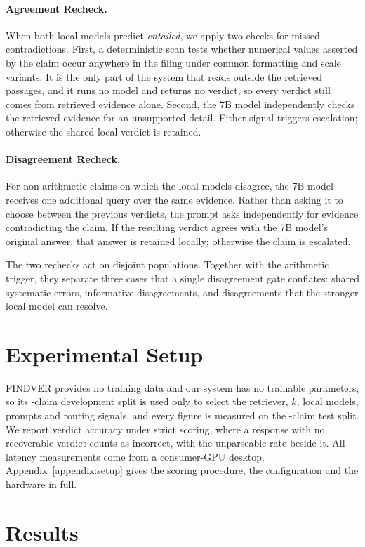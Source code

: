 \documentclass{article}
\begin{document}
\paragraph{Agreement Recheck.}
When both local models predict \emph{entailed}, we apply two checks for missed contradictions. First, a deterministic scan tests whether numerical values asserted by the claim occur anywhere in the filing under common formatting and scale variants. It is the only part of the system that reads outside the retrieved passages, and it runs no model and returns no verdict, so every verdict still comes from retrieved evidence alone. Second, the 7B model independently checks the retrieved evidence for an unsupported detail. Either signal triggers escalation; otherwise the shared local verdict is retained.

\paragraph{Disagreement Recheck.}
For non-arithmetic claims on which the local models disagree, the 7B model receives one additional query over the same evidence. Rather than asking it to choose between the previous verdicts, the prompt asks independently for evidence contradicting the claim. If the resulting verdict agrees with the 7B model's original answer, that answer is retained locally; otherwise the claim is escalated.

The two rechecks act on disjoint populations. Together with the arithmetic trigger, they separate three cases that a single disagreement gate conflates: shared systematic errors, informative disagreements, and disagreements that the stronger local model can resolve.


\section{Experimental Setup}
\label{sec:setup}
FINDVER provides no training data and our system has no trainable parameters, so its \nDev{}-claim development split is used only to select the retriever, $k$, local models, prompts and routing signals, and every figure is measured on the \nTest{}-claim test split. We report verdict accuracy under strict scoring, where a response with no recoverable verdict counts as incorrect, with the unparseable rate beside it. All latency measurements come from a consumer-GPU desktop. Appendix~\ref{appendix:setup} gives the scoring procedure, the configuration and the hardware in full.
\section{Results}
\label{sec:results}
\end{document}
